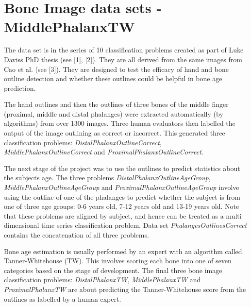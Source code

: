 \chapter{Bone Image data sets -\/ Middle\+Phalanx\+TW}
\hypertarget{md_external_2data_2UCRArchive__2018_2MiddlePhalanxTW_2README}{}\label{md_external_2data_2UCRArchive__2018_2MiddlePhalanxTW_2README}
\label{md_external_2data_2UCRArchive__2018_2MiddlePhalanxTW_2README_autotoc_md147}%
%
 The data set is in the series of 10 classification problems created as part of Luke Davis\textquotesingle{}s PhD thesis (see \mbox{[}1\mbox{]}, \mbox{[}2\mbox{]}). They are all derived from the same images from Cao et al. (see \mbox{[}3\mbox{]}). They are designed to test the efficacy of hand and bone outline detection and whether these outlines could be helpful in bone age prediction.

The hand outlines and then the outlines of three bones of the middle finger (proximal, middle and distal phalanges) were extracted automatically (by algorithms) from over 1300 images. Three human evaluators then labelled the output of the image outlining as correct or incorrect. This generated three classification problems\+: {\itshape Distal\+Phalanx\+Outline\+Correct}, {\itshape Middle\+Phalanx\+Outline\+Correct} and {\itshape Proximal\+Phalanx\+Outline\+Correct}.

The next stage of the project was to use the outlines to predict statistics about the subjects age. The three problems {\itshape Distal\+Phalanx\+Outline\+Age\+Group}, {\itshape Middle\+Phalanx\+Outline\+Age\+Group} and {\itshape Proximal\+Phalanx\+Outline\+Age\+Group} involve using the outline of one of the phalanges to predict whether the subject is from one of three age groups\+: 0-\/6 years old, 7-\/12 years old and 13-\/19 years old. Note that these problems are aligned by subject, and hence can be treated as a multi dimensional time series classification problem. Data set {\itshape Phalanges\+Outlines\+Correct} contains the concatenation of all three problems.

Bone age estimation is usually performed by an expert with an algorithm called Tanner-\/\+Whitehouse (TW). This involves scoring each bone into one of seven categories based on the stage of development. The final three bone image classification problems\+: {\itshape Distal\+Phalanx\+TW}, {\itshape Middle\+Phalanx\+TW} and {\itshape Proximal\+Phalanx\+TW} are about predicting the Tanner-\/\+Whitehouse score from the outlines as labelled by a human expert.

